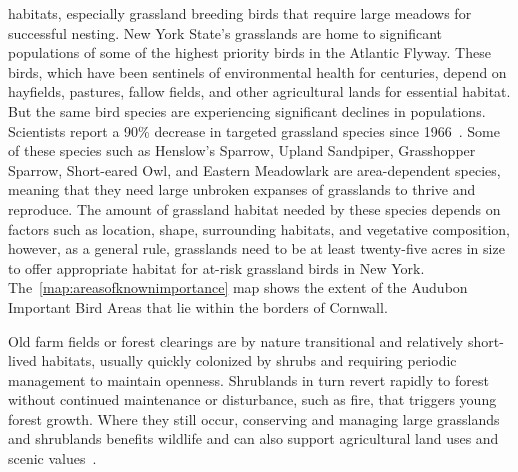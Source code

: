 habitats, especially grassland breeding birds that require large meadows for
successful nesting. New York State's grasslands are home to significant
populations of some of the highest priority birds in the Atlantic Flyway. These
birds, which have been sentinels of environmental health for centuries, depend
on hayfields, pastures, fallow fields, and other agricultural lands for
essential habitat. But the same bird species are experiencing significant
declines in populations. Scientists report a 90\% decrease in targeted
grassland species since 1966~\citep{audoboniba}. Some of these species such as Henslow's
Sparrow, Upland Sandpiper, Grasshopper Sparrow, Short-eared Owl, and Eastern
Meadowlark are area-dependent species, meaning that they need large unbroken
expanses of grasslands to thrive and reproduce. The amount of grassland habitat
needed by these species depends on factors such as location, shape, surrounding
habitats, and vegetative composition, however, as a general rule, grasslands
need to be at least twenty-five acres in size to offer appropriate habitat for
at-risk grassland birds in New York. The~\ref{map:areasofknownimportance}
map shows the extent of the Audubon Important Bird Areas that lie within the
borders of Cornwall.
\par
Old farm fields or forest clearings are by nature transitional and relatively
short-lived habitats, usually quickly colonized by shrubs and requiring
periodic management to maintain openness. Shrublands in turn revert rapidly to
forest without continued maintenance or disturbance, such as fire, that
triggers young forest growth. Where they still occur, conserving and managing
large grasslands and shrublands benefits wildlife and can also support
agricultural land uses and scenic values~\citep{haeckel2014}.
